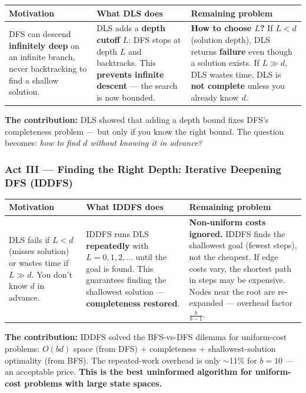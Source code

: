 \documentclass[12pt, a4paper]{article}
\begin{document}
\begin{center}
\renewcommand{\arraystretch}{1.2}
\begin{tabular}{p{3.5cm}|p{6cm}|p{6cm}}
\toprule
\textbf{Motivation} & \textbf{What DLS does} & \textbf{Remaining problem} \\
\midrule
DFS can descend \textbf{infinitely deep} on an infinite branch, never backtracking to find a shallow solution. &
DLS adds a \textbf{depth cutoff} $L$: DFS stops at depth $L$ and backtracks. This \textbf{prevents infinite descent} — the search is now bounded. &
\textbf{How to choose $L$?} If $L < d$ (solution depth), DLS returns \textbf{failure} even though a solution exists. If $L \gg d$, DLS wastes time. DLS is \textbf{not complete} unless you already know $d$. \\
\bottomrule
\end{tabular}
\end{center}

\noindent\textbf{The contribution:} DLS showed that adding a depth bound fixes DFS's completeness problem — but only if you know the right bound. The question becomes: \emph{how to find $d$ without knowing it in advance?}

\subsubsection*{Act III — Finding the Right Depth: Iterative Deepening DFS (IDDFS)}

\begin{center}
\renewcommand{\arraystretch}{1.2}
\begin{tabular}{p{3.5cm}|p{6cm}|p{6cm}}
\toprule
\textbf{Motivation} & \textbf{What IDDFS does} & \textbf{Remaining problem} \\
\midrule
DLS fails if $L < d$ (misses solution) or wastes time if $L \gg d$. You don't know $d$ in advance. &
IDDFS runs DLS \textbf{repeatedly} with $L = 0, 1, 2, \ldots$ until the goal is found. This guarantees finding the shallowest solution — \textbf{completeness restored}. &
\textbf{Non-uniform costs ignored.} IDDFS finds the shallowest goal (fewest steps), not the cheapest. If edge costs vary, the shortest path in steps may be expensive. Nodes near the root are re-expanded — overhead factor $\frac{b}{b-1}$. \\
\bottomrule
\end{tabular}
\end{center}

\noindent\textbf{The contribution:} IDDFS solved the BFS-vs-DFS dilemma for uniform-cost problems: $O(bd)$ space (from DFS) $+$ completeness $+$ shallowest-solution optimality (from BFS). The repeated-work overhead is only $\sim$11\% for $b{=}10$ — an acceptable price. \textbf{This is the best uninformed algorithm for uniform-cost problems with large state spaces.}
\end{document}
